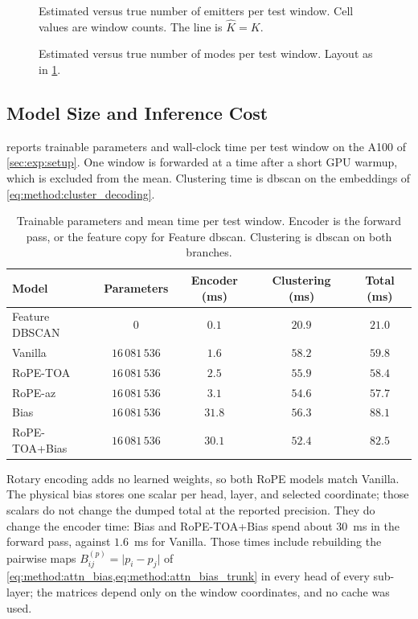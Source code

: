 \begin{figure}[tbp]
  \centering
  \caption{Estimated versus true number of emitters per test window. Cell values are window counts. The line is $\hat{K}=K$.}
  \label{fig:exp:kcorr_em}
\end{figure}

\begin{figure}[tbp]
  \centering
  \caption{Estimated versus true number of modes per test window. Layout as in \cref{fig:exp:kcorr_em}.}
  \label{fig:exp:kcorr_md}
\end{figure}

\subsection{Model Size and Inference Cost}\label{sec:exp:results:efficiency}

 reports trainable parameters and wall-clock time per test window on the A100 of \cref{sec:exp:setup}.
One window is forwarded at a time after a short GPU warmup, which is excluded from the mean.
Clustering time is \gls{dbscan} on the embeddings of \cref{eq:method:cluster_decoding}.

\begin{table}[H]
  \centering
  \caption{Trainable parameters and mean time per test window. Encoder is the forward pass, or the feature copy for Feature \gls{dbscan}. Clustering is \gls{dbscan} on both branches.}
  \label{tab:exp:efficiency}
  \begin{tabular}{@{}lcccc@{}}
    \toprule
    Model & Parameters & Encoder (ms) & Clustering (ms) & Total (ms) \\
    \midrule
    Feature DBSCAN & $0$ & $0.1$ & $20.9$ & $21.0$ \\
    Vanilla   & $16\,081\,536$ & $1.6$ & $58.2$ & $59.8$ \\
    RoPE-TOA  & $16\,081\,536$ & $2.5$ & $55.9$ & $58.4$ \\
    RoPE-az   & $16\,081\,536$ & $3.1$ & $54.6$ & $57.7$ \\
    Bias      & $16\,081\,536$ & $31.8$ & $56.3$ & $88.1$ \\
    RoPE-TOA+Bias & $16\,081\,536$ & $30.1$ & $52.4$ & $82.5$ \\
    \bottomrule
  \end{tabular}
\end{table}

Rotary encoding adds no learned weights, so both RoPE models match Vanilla.
The physical bias stores one scalar per head, layer, and selected coordinate; those scalars do not change the dumped total at the reported precision.
They do change the encoder time: Bias and RoPE-TOA+Bias spend about $30$~ms in the forward pass, against $1.6$~ms for Vanilla.
Those times include rebuilding the pairwise maps $B^{(p)}_{ij}=\lvert p_i-p_j\rvert$ of \cref{eq:method:attn_bias,eq:method:attn_bias_trunk} in every head of every sub-layer; the matrices depend only on the window coordinates, and no cache was used.

